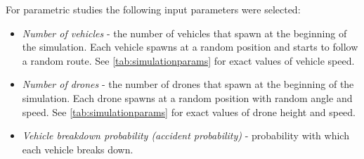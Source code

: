 \documentclass[]{nsm-thesis}
\begin{document}
For parametric studies the following input parameters were selected:

\begin{itemize}

	\item \emph{Number of vehicles} - the number of vehicles that spawn at the beginning of the simulation. Each vehicle spawns at a random position and starts to follow a random route. See \cref{tab:simulationparams} for exact values of vehicle speed.
	
	\item \emph{Number of drones} - the number of drones that spawn at the beginning of the simulation. Each drone spawns at a random position with random angle and speed. See \cref{tab:simulationparams} for exact values of drone height and speed.
	
	\item \emph{Vehicle breakdown probability (accident probability)} - probability with which each vehicle breaks down.
\end{itemize}
\end{document}
